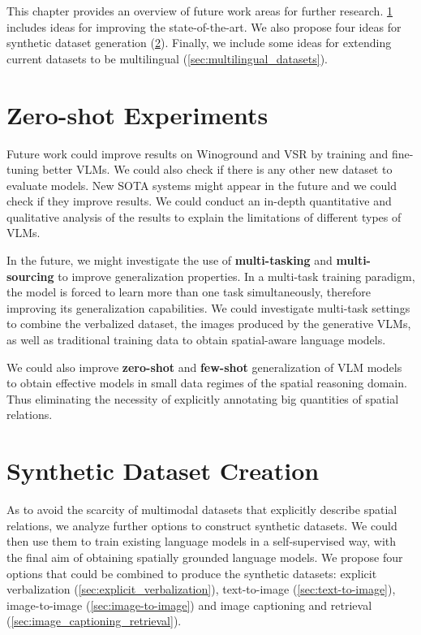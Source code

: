 This chapter provides an overview of future work areas for further research. \cref{sec:zero_shot} includes ideas for improving the state-of-the-art. We also propose four ideas for synthetic dataset generation (\cref{sec:synthetic_dataset}). Finally, we include some ideas for extending current datasets to be multilingual (\cref{sec:multilingual_datasets}).

\section{Zero-shot Experiments} \label{sec:zero_shot}

Future work could improve results on Winoground and VSR by training and fine-tuning better VLMs. We could also check if there is any other new dataset to evaluate models. New SOTA systems might appear in the future and we could check if they improve results. We could conduct an in-depth quantitative and qualitative analysis of the results to explain the limitations of different types of VLMs.

In the future, we might investigate the use of \textbf{multi-tasking} and \textbf{multi-sourcing} to improve generalization properties. In a multi-task training paradigm, the model is forced to learn more than one task simultaneously, therefore improving its generalization capabilities. We could investigate multi-task settings to combine the verbalized dataset, the images produced by the generative VLMs, as well as traditional training data to obtain spatial-aware language models.

We could also improve \textbf{zero-shot} and \textbf{few-shot} generalization of VLM models to obtain effective models in small data regimes of the spatial reasoning domain. Thus eliminating the necessity of explicitly annotating big quantities of spatial relations.

\section{Synthetic Dataset Creation} \label{sec:synthetic_dataset}

As to avoid the scarcity of multimodal datasets that explicitly describe spatial relations, we analyze further options to construct synthetic datasets. We could then use them to train existing language models in a self-supervised way, with the final aim of obtaining spatially grounded language models. We propose four options that could be combined to produce the synthetic datasets: explicit verbalization (\ref{sec:explicit_verbalization}), text-to-image (\ref{sec:text-to-image}), image-to-image (\ref{sec:image-to-image}) and image captioning and retrieval (\ref{sec:image_captioning_retrieval}).

